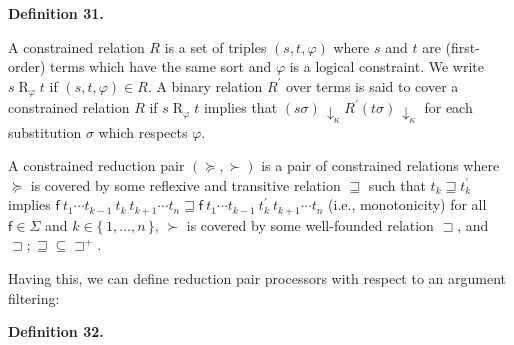  
 
\par\medskip\noindent\textbf{Definition 31.}\par
 
 
A constrained relation $R$ is a set of triples $(s,t,\varphi)$ where $s$ and $t$ are (first-order) terms which have the same sort and $\varphi$ is a logical constraint. We write ${s}\mathrel{R}_{\varphi}{t}$ if $(s,t,\varphi)\in R$. A binary relation $R^{\prime}$ over terms is said to cover a constrained relation $R$ if ${s}\mathrel{R}_{\varphi}{t}$ implies that $(s\sigma)\,{\downarrow}_{\kappa}\mathrel{R^{\prime}}(t\sigma)\,{\downarrow}_{\kappa}$ for each substitution $\sigma$ which respects $\varphi$.\par
 
 
 
A constrained reduction pair $(\succeq,\succ)$ is a pair of constrained relations where $\succeq$ is covered by some reflexive and transitive relation $\sqsupseteq$ such that $t_{k}\sqsupseteq t_{k}^{\prime}$ implies ${{{\mathsf{f}}\ {{t}_{1}\cdots{t}_{k-1}}}\ {t_{k}}}\ {{t}_{k+1}\cdots{t}_{n}}\sqsupseteq{{{\mathsf{f}}\ {{t}_{1}\cdots{t}_{k-1}}}\ {t_{k}^{\prime}}}\ {{t}_{k+1}\cdots{t}_{n}}$ (i.e., monotonicity) for all $\mathsf{f}\in\Sigma$ and $k\in\{\,1,\ldots,n\,\}$, $\succ$ is covered by some well-founded relation $\sqsupset$, and ${\sqsupset}\mathrel{;}{\sqsupseteq}\subseteq{\sqsupset^{+}}$.\par
 
 
 
 
Having this, we can define reduction pair processors with respect to an argument filtering:\par
 
 
 
\par\medskip\noindent\textbf{Definition 32.}\par
 
 

